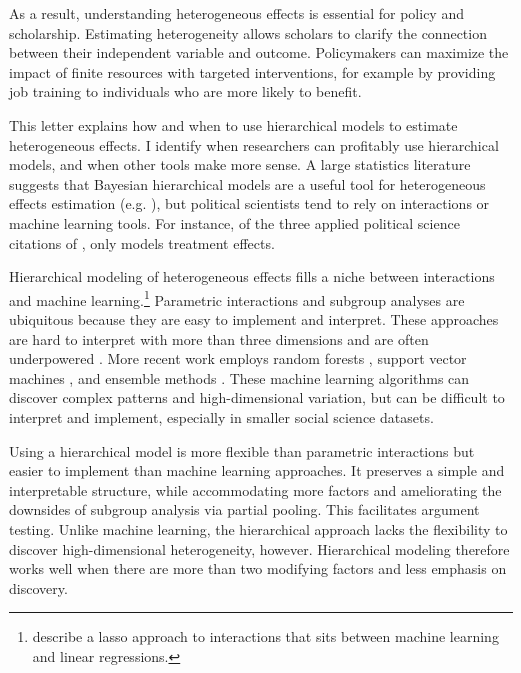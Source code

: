 \documentclass[12pt]{article}
\begin{document}
As a result, understanding heterogeneous effects is essential for policy and scholarship. 
Estimating heterogeneity allows scholars to clarify the connection between their independent variable and outcome.
Policymakers can maximize the impact of finite resources with targeted interventions, for example by providing job training to individuals who are more likely to benefit. 


This letter explains how and when to use hierarchical models to estimate heterogeneous effects. 
I identify when researchers can profitably use hierarchical models, and when other tools make more sense. 
A large statistics literature suggests that Bayesian hierarchical models are a useful tool for  heterogeneous effects estimation (e.g. \citep{FellerGelman2015, McElreath2016, Dorieetal2022}), but political scientists tend to rely on interactions or machine learning tools. 
For instance, of the three applied political science citations of \citet{FellerGelman2015}, only \citet{Marquardt2022} models treatment effects. 


Hierarchical modeling of heterogeneous effects fills a niche between interactions and machine learning.\footnote{\citet{BlackwellOlson2022} describe a lasso approach to interactions that sits between machine learning and linear regressions.}
Parametric interactions and subgroup analyses are ubiquitous because they are easy to implement and interpret.
These approaches are hard to interpret with more than three dimensions and are often underpowered \citep{Simmonsetal2011}.
More recent work employs random forests \citep{GreenKern2012, WagerAthey2018}, support vector machines \citep{ImaiRatkovic2013}, and ensemble methods \citep{Grimmeretal2017, Kuenzeletal2019, Dorieetal2022}.
These machine learning algorithms can discover complex patterns and high-dimensional variation, but can be difficult to interpret and implement, especially in smaller social science datasets.

 
Using a hierarchical model is more flexible than parametric interactions but easier to implement than machine learning approaches.  
It preserves a simple and interpretable structure, while accommodating more factors and ameliorating the downsides of subgroup analysis via partial pooling. 
This facilitates argument testing.
Unlike machine learning, the hierarchical approach lacks the flexibility to discover high-dimensional heterogeneity, however.  
Hierarchical modeling therefore works well when there are more than two modifying factors and less emphasis on discovery. 
\end{document}
